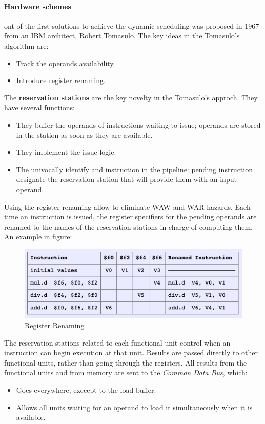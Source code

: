 \documentclass[12pt]{article}
\begin{document}
\paragraph{Hardware schemes} ont of the first solutions to achieve the dynamic scheduling was proposed in 1967 from an IBM architect, Robert Tomasulo. The key ideas in the Tomasulo's algorithm are:
\begin{itemize}
  \item Track the operands availability.
  \item Introduce register renaming.
\end{itemize}
The \textbf{reservation stations} are the key novelty in the Tomasulo's approch. They have several functions:
\begin{itemize}
  \item They buffer the operands of instructions waiting to issue; operands are stored in the station as soon as they are available.
  \item They implement the issue logic.
  \item The univocally identify and instruction in the pipeline: pending instruction designate the reservation station that will provide them with an input operand.
\end{itemize}
Using the register renaming allow to eliminate WAW and WAR hazards. Each time an instruction is issued, the register specifiers for the pending operands are renamed to the names of the reservation stations in charge of computing them. An example in figure:
\begin{figure}[h!]
  \centering
  \includegraphics[width=0.7\linewidth]{images/rename.png}
  \caption{Register Renaming}
  \label{fig:rename}
\end{figure}
The reservation stations related to each functional unit control when an instruction can begin execution at that unit. Results are passed directly to other functional units, rather than going through the registers. All results from the functional units and from memory are sent to the \textit{Common Data Bus}, which:
\begin{itemize}
  \item Goes everywhere, execept to the load buffer.
  \item Allows all units waiting for an operand to load it simultaneously when it is available.
\end{itemize}
\end{document}
